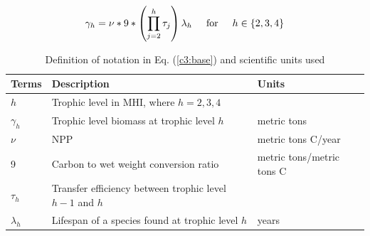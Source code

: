 \documentclass[oneside,12pt,final]{sty/ucthesis-CA2012}
\begin{document}
\begin{mainmatter}
\begin{equation} \label{c3:base}
\gamma_h = \nu * 9 * \left( \prod_{j=2}^{h} \tau_j \right) \lambda_h \hspace{5mm} \text{for} \hspace{5mm} h \in \{2, 3, 4\}
\end{equation}

\begin{table}[H]
\centering
\caption{Definition of notation in Eq. (\ref{c3:base}) and scientific units used}
\begin{tabular}{l|l|l}
  \hline \small
 Terms & Description & Units  \\ 
   \hline
   $h$ & Trophic level in MHI, where $h = 2,3,4$  & \\
   $\gamma_h$ &  Trophic level biomass at trophic level $h$ & metric tons  \\
   $\nu$ & NPP & metric tons C/year \\
   9 & Carbon to wet weight conversion ratio & metric tons/metric tons C \\
   $\tau_{h}$ & Transfer efficiency between trophic level $h-1$ and $h$ &   \\  
   $\lambda_h$ & Lifespan of a species found at trophic level $h$ & years \\
   \hline
\end{tabular} 
\label{c3:description}
\end{table}


\end{mainmatter}
\end{document}
